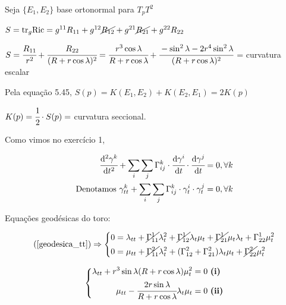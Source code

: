 \documentclass[10pt,a4paper]{article}
\begin{document}
		Seja $\{ E_1, E_2 \}$ base ortonormal para $T_pT^2$

		$S = \text{tr}_g \text{Ric} = g^{11} R_{11} + g^{12} \cancel{R_{12}} + g^{21} \cancel{R_{21}} + g^{22} R_{22}$

		$S = \cfrac{R_{11}}{r^2} + \cfrac{R_{22}}{(R + r \cos \lambda)^2} = \cfrac{r^3 \cos \lambda}{R + r \cos \lambda} + \cfrac{- \sin^2 \lambda - 2 r^4 \sin^2 \lambda}{(R + r \cos \lambda)^2}$ = curvatura escalar

		Pela equa\c{c}\~ao 5.45, $S(p) = K(E_1, E_2) + K(E_2, E_1) = 2 K(p)$

		$K(p) = \cfrac{1}{2} \cdot S(p) = $ curvatura seccional.

		\vspace{3mm}

		Como vimos no exerc\'icio 1,

		\begin{align}
		  \cfrac{\mathrm{d}^2 \gamma^k}{\mathrm{d} t^2} + \sum_i \sum_j \Gamma_{ij}^k \cdot \cfrac{\mathrm{d} \gamma^i}{\mathrm{d} t} \cdot \cfrac{\mathrm{d} \gamma^j}{\mathrm{d} t} &= 0, \forall k \\
		  \text{Denotamos } \gamma^k_{tt} + \sum_i \sum_j \Gamma_{ij}^k \cdot \gamma^i_t \cdot \gamma^j_t &= 0, \forall k \label{geodesica_tt}
		\end{align}

		Equa\c{c}\~oes geod\'esicas do toro:

		\begin{equation*}
			(\ref{geodesica_tt}) \Rightarrow \left\{\begin{aligned}
			    0 &= \lambda_{tt} + \cancel{\Gamma_{11}^1} \lambda_t^2 + \cancel{\Gamma_{12}^1} \lambda_t \mu_t + \cancel{\Gamma_{21}^1} \mu_t \lambda_t + \Gamma_{22}^1 \mu_t^2 \\
			    0 &= \mu_{tt} + \cancel{\Gamma_{11}^2} \lambda_t^2 + (\Gamma_{12}^2 + \Gamma_{21}^2) \lambda_t \mu_t + \cancel{\Gamma_{22}^2} \mu_t^2
			\end{aligned}
			\right.
		\end{equation*}

		\begin{equation*}
			\left\{\begin{aligned}
			    \lambda_{tt} + r^3 \sin \lambda (R + r \cos \lambda) \mu_t^2 &= 0 \,\,\textbf{(i)} \\
			    \mu_{tt} - \cfrac{2r \sin \lambda}{R + r \cos \lambda} \lambda_t \mu_t &= 0 \,\,\textbf{(ii)}
			\end{aligned}
			\right.
		\end{equation*}
\end{document}
